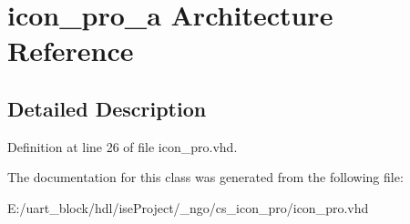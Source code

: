 \section{icon\-\_\-pro\-\_\-a Architecture Reference}
\label{classicon__pro_1_1icon__pro__a}


\subsection{Detailed Description}


Definition at line 26 of file icon\-\_\-pro.\-vhd.



The documentation for this class was generated from the following file\-:\begin{DoxyCompactItemize}
\item 
E\-:/uart\-\_\-block/hdl/ise\-Project/\-\_\-ngo/cs\-\_\-icon\-\_\-pro/icon\-\_\-pro.\-vhd\end{DoxyCompactItemize}
